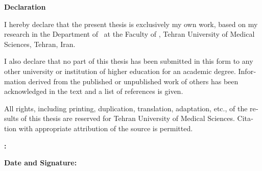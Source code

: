
\clearpage
\thispagestyle{empty}
\begin{latin}

\begin{center}
    {\fontsize{18}{22}\selectfont\textbf{Declaration}\par}
\end{center}

\vspace{1.5cm}

\noindent I hereby declare that the present thesis is exclusively my own work, based on my research in the Department of \DepartmentEN\ at the Faculty of \FacultyEN, Tehran University of Medical Sciences, Tehran, Iran.

\bigskip
\noindent I also declare that no part of this thesis has been submitted in this form to any other university or institution of higher education for an academic degree. Information derived from the published or unpublished work of others has been acknowledged in the text and a list of references is given.

\bigskip
\noindent All rights, including printing, duplication, translation, adaptation, etc., of the results of this thesis are reserved for Tehran University of Medical Sciences. Citation with appropriate attribution of the source is permitted.

\vspace{2.5cm}

\begin{flushright}
    \begin{minipage}{0.45\textwidth}
        \fontsize{14}{18}\selectfont\textbf{\StudentNameEN :}\par
        \vspace{0.3cm}
        \textbf{Date and Signature:} 
    \end{minipage}
\end{flushright}

\end{latin}
\clearpage
